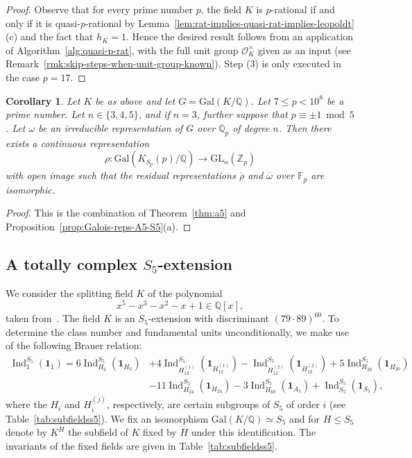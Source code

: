 \documentclass[12pt, a4paper, usenames]{amsart}
\newcommand{\Z}{\mathbb{Z}}
\newcommand{\Q}{\mathbb{Q}}
\newcommand{\F}{\mathbb{F}}
\DeclareMathOperator{\Ind}{Ind}
\theoremstyle{plain}
\newtheorem{corollary}[theorem]{Corollary}
\theoremstyle{remark}
\theoremstyle{definition}
\newcommand{\Gal}{\mathrm{Gal}}
\begin{document}
\begin{proof}
Observe that for every prime number $p$, the field
$K$ is $p$-rational if and only if it is quasi-$p$-rational by
Lemma~\ref{lem:rat-implies-quasi-rat-implies-leopoldt}(c) and
the fact that $h_{K}=1$.
Hence the desired result follows from an application of Algorithm~\ref{alg:quasi-p-rat},
with the full unit group $\mathcal{O}_{K}^{\times}$ given as an input (see Remark~\ref{rmk:skip-steps-when-unit-group-known}).
Step (3) is only executed in the case $p=17$.
\end{proof}

\begin{corollary}
Let $K$ be as above and let $G=\Gal(K/\Q)$.
Let $7 \leq p < 10^{8}$ be a prime number. 
Let $n \in \{ 3,4,5 \}$, and if $n=3$, further suppose that $p \equiv \pm 1 \bmod 5$.
Let $\omega$ be an irreducible representation of $G$ over 
$\Q_{p}$ of degree $n$. 
Then there exists a continuous representation
\[
\rho : \Gal(K_{S_{p}}(p)/\Q) \longrightarrow \mathrm{GL}_{n}(\Z_{p})
\]
with open image such that the residual representations $\overline{\rho}$ 
and $\overline{\omega}$ over $\F_{p}$ are isomorphic.
\end{corollary}

\begin{proof}
This is the combination of 
Theorem~\ref{thm:a5} and Proposition~\ref{prop:Galois-reps-A5-S5}(a).
\end{proof}

\subsection{A totally complex $S_{5}$-extension}\label{subsec:S5}
We consider the splitting field $K$ of the polynomial 
\[
x^5 - x^3 - x^2 - x + 1 \in \Q[x],
\]
taken from~\cite{MR1901356}. The field $K$ is an $S_5$-extension with discriminant $(79 \cdot 89)^{60}$.
To determine the class number and fundamental units unconditionally, we make use of the following Brauer relation:
\begin{align*} 
\Ind_{1}^{S_{5}}(\mathbf{1}_1) 
= 6 \Ind_{H_6}^{S_{5}}(\mathbf{1}_{H_6}) 
&+ 4 \Ind_{H_{12}^{(1)}}^{S_{5}}(\mathbf{1}_{H_{12}^{(1)}}) 
- \Ind_{H_{12}^{(2)}}^{S_{5}}(\mathbf{1}_{H_{12}^{(2)}}) 
+ 5 \Ind_{H_{20}}^{S_{5}}(\mathbf{1}_{H_{20}}) \\ 
&- 11 \Ind_{H_{24}}^{S_{5}}(\mathbf{1}_{H_{24}})
- 3\Ind_{H_{60}}^{S_{5}}(\mathbf{1}_{A_5}) 
+ \Ind_{S_{5}}^{S_{5}}(\mathbf{1}_{S_{5}}), 
\end{align*}
where the $H_i$ and $H_i^{(j)}$, respectively, are certain subgroups of $S_{5}$ of order $i$ (see  Table~\ref{tab:subfieldss5}). 
We fix an isomorphism $\Gal(K/\Q) \simeq S_{5}$ and for $H \leq S_{5}$
denote by $K^{H}$ the subfield of $K$ fixed by $H$ under this identification.
The invariants of the fixed fields are given in Table~\ref{tab:subfieldss5}.
\end{document}
